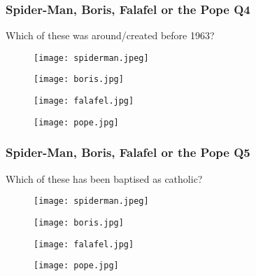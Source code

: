 \documentclass{beamer}
\begin{document}
\begin{frame}
\frametitle{Spider-Man, Boris, Falafel or the Pope Q4}
Which of these was around/created before 1963?
\begin{figure}[!htb]
    \centering
    \begin{minipage}{.5\textwidth}
        \centering
        \texttt{[image: spiderman.jpeg]}
        
    \end{minipage}%
    \begin{minipage}{0.5\textwidth}
        \centering
        \texttt{[image: boris.jpg]}
        
    \end{minipage}
\end{figure}
\begin{figure}[!htb]
    \centering
    \begin{minipage}{.5\textwidth}
        \centering
        \texttt{[image: falafel.jpg]}
        
    \end{minipage}%
    \begin{minipage}{0.5\textwidth}
        \centering
        \texttt{[image: pope.jpg]}
        
    \end{minipage}
\end{figure}
\end{frame}


\begin{frame}
\frametitle{Spider-Man, Boris, Falafel or the Pope Q5}
Which of these has been baptised as catholic?
\begin{figure}[!htb]
    \centering
    \begin{minipage}{.5\textwidth}
        \centering
        \texttt{[image: spiderman.jpeg]}
        
    \end{minipage}%
    \begin{minipage}{0.5\textwidth}
        \centering
        \texttt{[image: boris.jpg]}
        
    \end{minipage}
\end{figure}
\begin{figure}[!htb]
    \centering
    \begin{minipage}{.5\textwidth}
        \centering
        \texttt{[image: falafel.jpg]}
        
    \end{minipage}%
    \begin{minipage}{0.5\textwidth}
        \centering
        \texttt{[image: pope.jpg]}
        
    \end{minipage}
\end{figure}
\end{frame}
\end{document}
